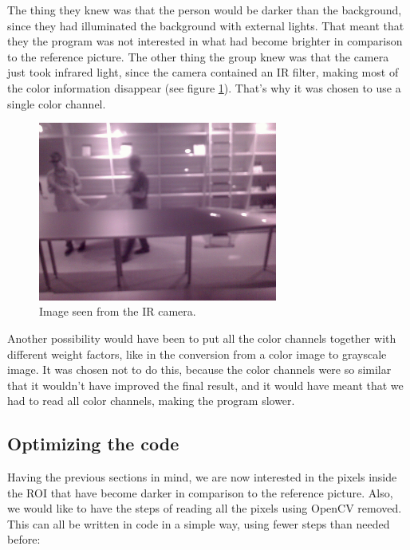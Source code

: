 The thing they knew was that the person would be darker than the background, since they had illuminated the background with external lights. That meant that they the program was not interested in what had become brighter in comparison to the reference picture. The other thing the group knew was that the camera just took infrared light, since the camera contained an IR filter, making most of the color information disappear (see figure \ref{fig:ir_max}). That's why it was chosen to use a single color channel.

\begin{figure}[htbp]
\centering
\includegraphics[width=0.7\textwidth]{Pictures/Design/ir_max}
\caption{Image seen from the IR camera.}
\label{fig:ir_max}
\end{figure}

Another possibility would have been to put all the color channels together with different weight factors, like in the conversion from a color image to grayscale image. It was chosen not to do this, because the color channels were so similar that it wouldn't have improved the final result, and it would have meant that we had to read all color channels, making the program slower. 

\subsection{Optimizing the code}\label{forInOne}
Having the previous sections in mind, we are now interested in the pixels inside the ROI that have become darker in comparison to the reference picture. Also, we would like to have the steps of reading all the pixels using OpenCV removed. This can all be written in code in a simple way, using fewer steps than needed before:


